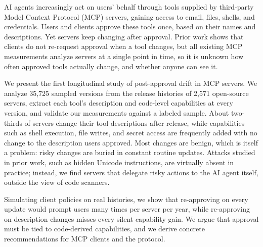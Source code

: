 AI agents increasingly act on users' behalf through tools supplied by third-party Model Context Protocol (MCP) servers, gaining access to email, files, shells, and credentials. Users and clients approve these tools once, based on their names and descriptions. Yet servers keep changing after approval. Prior work shows that clients do not re-request approval when a tool changes, but all existing MCP measurements analyze servers at a single point in time, so it is unknown how often approved tools actually change, and whether anyone can see it.

We present the first longitudinal study of post-approval drift in MCP servers. We analyze 35,725 sampled versions from the release histories of 2,571 open-source servers, extract each tool's description and code-level capabilities at every version, and validate our measurements against a labeled sample. About two-thirds of servers change their tool descriptions after release, while capabilities such as shell execution, file writes, and secret access are frequently added with no change to the description users approved. Most changes are benign, which is itself a problem: risky changes are buried in constant routine updates. Attacks studied in prior work, such as hidden Unicode instructions, are virtually absent in practice; instead, we find servers that delegate risky actions to the AI agent itself, outside the view of code scanners.

Simulating client policies on real histories, we show that re-approving on every update would prompt users many times per server per year, while re-approving on description changes misses every silent capability gain. We argue that approval must be tied to code-derived capabilities, and we derive concrete recommendations for MCP clients and the protocol.
